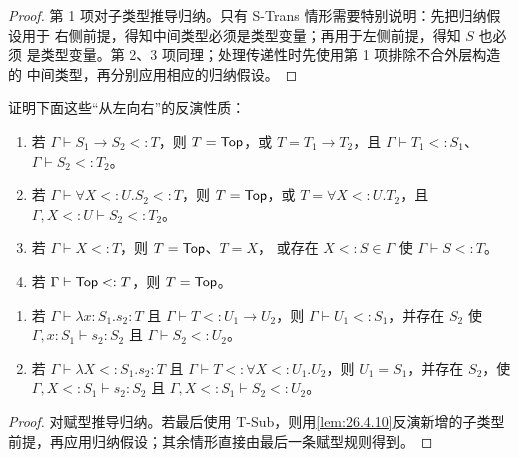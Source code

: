 \begin{proof}
第 1 项对子类型推导归纳。只有 S-Trans 情形需要特别说明：先把归纳假设用于
右侧前提，得知中间类型必须是类型变量；再用于左侧前提，得知 \(S\) 也必须
是类型变量。第 2、3 项同理；处理传递性时先使用第 1 项排除不合外层构造的
中间类型，再分别应用相应的归纳假设。
\end{proof}

\begin{exercise}
\label{ex:26.4.11}
证明下面这些“从左向右”的反演性质：
\begin{enumerate}
  \item 若 \(\Gamma\vdash S_1\to S_2<:T\)，则 \(T=\mathsf{Top}\)，或
        \(T=T_1\to T_2\)，且 \(\Gamma\vdash T_1<:S_1\)、
        \(\Gamma\vdash S_2<:T_2\)。
  \item 若 \(\Gamma\vdash\forall X<:U.S_2<:T\)，则
        \(T=\mathsf{Top}\)，或 \(T=\forall X<:U.T_2\)，且
        \(\Gamma,X<:U\vdash S_2<:T_2\)。
  \item 若 \(\Gamma\vdash X<:T\)，则 \(T=\mathsf{Top}\)、\(T=X\)，
        或存在 \(X<:S\in\Gamma\) 使 \(\Gamma\vdash S<:T\)。
  \item 若 \(\Gamma\vdash\mathsf{Top}<:T\)，则
        \(T=\mathsf{Top}\)。
\end{enumerate}
\end{exercise}

\taplstatementliststart
\begin{lemma}
\label{lem:26.4.12}
\taplstatementlistbreak
\begin{enumerate}
  \item 若 \(\Gamma\vdash\lambda x:S_1.s_2:T\) 且
        \(\Gamma\vdash T<:U_1\to U_2\)，则
        \(\Gamma\vdash U_1<:S_1\)，并存在 \(S_2\) 使
        \(\Gamma,x:S_1\vdash s_2:S_2\) 且
        \(\Gamma\vdash S_2<:U_2\)。
  \item 若 \(\Gamma\vdash\lambda X<:S_1.s_2:T\) 且
        \(\Gamma\vdash T<:\forall X<:U_1.U_2\)，则 \(U_1=S_1\)，并存在
        \(S_2\)，使
        \(\Gamma,X<:S_1\vdash s_2:S_2\) 且
        \(\Gamma,X<:S_1\vdash S_2<:U_2\)。
\end{enumerate}
\end{lemma}

\begin{proof}
对赋型推导归纳。若最后使用 T-Sub，则用\cref{lem:26.4.10}反演新增的子类型
前提，再应用归纳假设；其余情形直接由最后一条赋型规则得到。
\end{proof}

